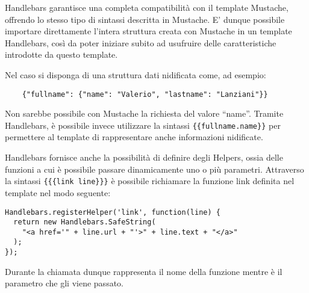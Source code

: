 Handlebars garantisce una completa compatibilità con il template Mustache, offrendo lo stesso tipo di sintassi descritta in Mustache. E' dunque possibile importare direttamente l'intera struttura creata con Mustache in un template Handlebars, così da poter iniziare subito ad usufruire delle caratteristiche introdotte da questo template.

Nel caso si disponga di una struttura dati nidificata come, ad esempio:
\begin{lstlisting}
    {"fullname": {"name": "Valerio", "lastname": "Lanziani"}}
\end{lstlisting}
Non sarebbe possibile con Mustache la richiesta del valore ``name''. Tramite Handlebars, è possibile invece utilizzare la sintassi \lstinline!{{fullname.name}}! per permettere al template di rappresentare anche informazioni nidificate.

Handlebars fornisce anche la possibilità di definire degli Helpers, ossia delle funzioni a cui è possibile passare dinamicamente uno o più parametri. Attraverso la sintassi \lstinline!{{{link line}}}! è possibile richiamare la funzione link definita nel template nel modo seguente:
\begin{lstlisting}
Handlebars.registerHelper('link', function(line) {
  return new Handlebars.SafeString(
    "<a href='" + line.url + "'>" + line.text + "</a>"
  );
});
\end{lstlisting}
Durante la chiamata dunque  rappresenta il nome della funzione mentre  è il parametro che gli viene passato.




